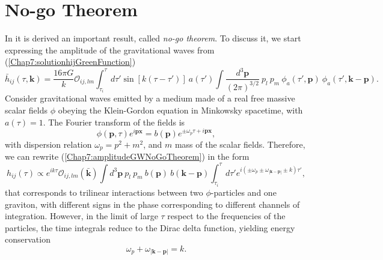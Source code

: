 \documentclass[11pt,a4paper,twoside]{book}
\begin{document}
\section{No-go Theorem}
In \cite{Chap7:GreenMethod} it is derived an important result, called \textit{no-go theorem}. To discuss it, we start expressing the amplitude of the gravitational waves from (\ref{Chap7:solutionhijGreenFunction}) 
\begin{equation}
\label{Chap7:amplitudeGWNoGoTheorem}
\bar{h}_{ij}(\tau,\textbf{k}) = \frac{16\pi G}{k}\mathcal{O}_{ij,lm}\int^{\tau}_{\tau_{i}} d\tau' \sin [k(\tau - \tau')]\  a(\tau')\int \frac{d^{3}\textbf{p}}{(2\pi)^{3/2}}\ p_{l}\  p_{m}\  \phi_{a}(\tau',\textbf{p})\  \phi_{a}(\tau',\textbf{k}-\textbf{p}).
\end{equation}
Consider gravitational waves emitted by a medium made of a real free massive scalar fields $\phi$ obeying the Klein-Gordon equation in Minkowsky spacetime, with $ a(\tau)=1 $. The Fourier transform of the fields is 
\begin{equation}
\label{Chap7:FourierTransformField}
\phi(\textbf{p},\tau)e^{i\textbf{p}\textbf{x}}=b(\textbf{p})e^{\pm \omega_{p}\tau + i \textbf{p}\textbf{x}},
\end{equation}
with dispersion relation $ \omega_{p}=p^{2}+m^{2} $, and $ m $ mass of the scalar fields. Therefore, we can rewrite (\ref{Chap7:amplitudeGWNoGoTheorem}) in the form
\begin{equation}
\label{Chap7:AmplitudeGWTrilinearInteraction}
h_{ij}(\tau) \propto e^{ik\tau}\mathcal{O}_{ij,lm}(\bar{\textbf{k}})\int d^{3}\textbf{p}\ p_{l}\ p_{m}\  b(\textbf{p})\ b(\textbf{k}-\textbf{p})\int^{\tau}_{\tau_{i}}d\tau'e^{i(\pm \omega_{p} \pm \omega_{|\textbf{k}-\textbf{p}|}  \pm k)\tau'},
\end{equation}
that corresponds to trilinear interactions between two $\phi$-particles and one graviton, with different signs in the phase corresponding to different channels of integration. However, in the limit of large $\tau$ respect to the frequencies of the particles, the time integrals reduce to the Dirac delta function, yielding energy conservation
\begin{equation}
\label{Chap7:NoGoTheorem_EnergyConservation}
\omega_{p} + \omega_{|\textbf{k}-\textbf{p}|}=k.
\end{equation}
\end{document}
